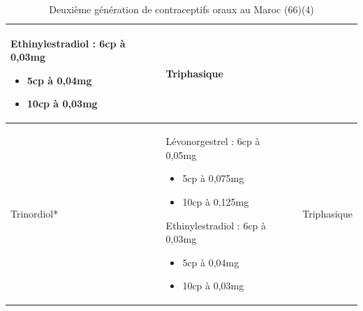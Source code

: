 \begin{table}[H]
\begin{spacing}{1.35}
\begin{tabularx}{\textwidth}{|X|p{8cm}|X|}
Ethinylestradiol : 6cp à 0,03mg
\begin{itemize}[label={}, nosep]
  \item \hspace{22mm}5cp à 0,04mg 
  \item \hspace{22mm}10cp à 0,03mg  
\end{itemize}
& Triphasique \\
\hline
Trinordiol* & Lévonorgestrel : 6cp à 0,05mg 
\begin{itemize}[label={}, nosep]
  \item \hspace{22mm}5cp à 0,075mg  
  \item \hspace{22mm}10cp à 0,125mg  
\end{itemize} 
Ethinylestradiol : 6cp à 0,03mg
\begin{itemize}[label={}, nosep]
  \item \hspace{22mm}5cp à 0,04mg  
  \item \hspace{22mm}10cp à 0,03mg  
\end{itemize}
\vspace{1em}
& Triphasique \\
      \hline
  \end{tabularx}
\end{spacing}
  \caption{Deuxième génération de contraceptifs oraux au Maroc (66)(4)}
\end{table}




